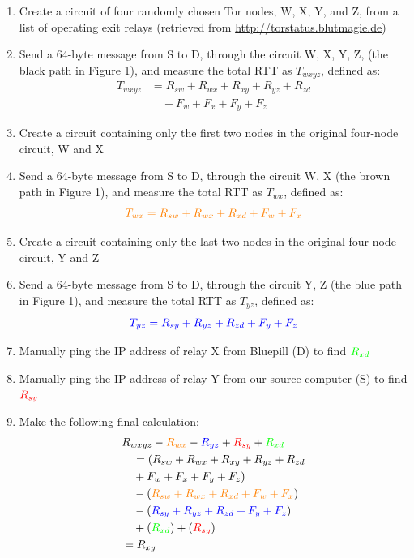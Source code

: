 \documentclass[twocolumn,11pt]{article}
\begin{document}
\begin{enumerate}
\item Create a circuit of four randomly chosen Tor nodes, W, X, Y, and Z, from a list of operating exit relays (retrieved from \href{http://torstatus.blutmagie.de}{http://torstatus.blutmagie.de})
\item Send a 64-byte message from S to D, through the circuit W, X, Y, Z, (the black path in Figure 1), and measure the total RTT as $T_{wxyz}$, defined as:
\begin{align*}
T_{wxyz} &= R_{sw} + R_{wx} + R_{xy} + R_{yz} + R_{zd} \\
  &\quad + F_w + F_x + F_y + F_z
\end{align*}
\item Create a circuit containing only the first two nodes in the original four-node circuit, W and X
\item Send a 64-byte message from S to D, through the circuit W, X (the brown path in Figure 1), and measure the total RTT as $T_{wx}$, defined as:
\[\color{orange} 
T_{wx} = R_{sw} + R_{wx} + R_{xd} + F_w + F_x
\]
\vspace{-.7cm}
\item Create a circuit containing only the last two nodes in the original four-node circuit, Y and Z
\item Send a 64-byte message from S to D, through the circuit Y, Z (the blue path in Figure 1), and measure the total RTT as $T_{yz}$, defined as:
\[\color{blue}
T_{yz} = R_{sy} + R_{yz} + R_{zd} + F_y + F_z
\] 
\vspace{-.7cm}
\item Manually ping the IP address of relay X from Bluepill (D) to find $\color{green} R_{xd}$
\item Manually ping the IP address of relay Y from our source computer (S) to find $\color{red} R_{sy}$
\item Make the following final calculation:
\begin{align*}
& R_{wxyz} - \color{orange}R_{wx} \color{black}- \color{blue}R_{yz} \color{black}+ \color{red}R_{sy} \color{black}+ \color{green}R_{xd} \\
&\quad = (\color{black} R_{sw} + R_{wx} + R_{xy} + R_{yz} + R_{zd} \\&\quad + F_w + F_x + F_y + F_z) \\
&\quad - (\color{orange} R_{sw} + R_{wx} + R_{xd} + F_w + F_x\color{black}) \\
&\quad - (\color{blue} R_{sy} + R_{yz} + R_{zd} + F_y + F_z\color{black})\\
&\quad + (\color{green} R_{xd}\color{black}) + (\color{red} R_{sy}\color{black}) \\
& = R_{xy}
\end{align*}
\end{enumerate}
\end{document}
